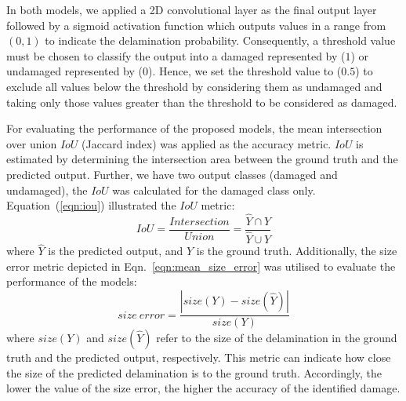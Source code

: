 In both models, we applied a 2D convolutional layer as the final output layer followed by a sigmoid activation function which outputs values in a range from \((0,1)\) to indicate the delamination probability.
Consequently, a threshold value must be chosen to classify the output into a damaged represented by (\(1\)) or undamaged represented by (\(0\)).
Hence, we set the threshold value to (\(0.5\)) to exclude all values below the threshold by considering them as undamaged and taking only those values greater than the threshold to be considered as damaged.

For evaluating the performance of the proposed models, the mean 
intersection over union \(IoU\) (Jaccard index) was applied as the accuracy metric. 
\(IoU\) is estimated by determining the intersection
area between the ground truth and the predicted output. 
Further, we have two output classes (damaged and undamaged), the \(IoU\) was calculated for the damaged class only. 
Equation~(\ref{eqn:iou}) illustrated the \(IoU\) metric: 
\begin{equation}
	IoU=\frac{Intersection}{Union}=\frac{\hat{Y} \cap Y}{\hat{Y} \cup Y}
	\label{eqn:iou}
\end{equation}
where \(\hat{Y}\) is the predicted output, and \(Y\) is the ground truth.
Additionally, the size error metric depicted in Eqn.~\ref{eqn:mean_size_error} was utilised to evaluate the performance of the models:
\begin{equation}
	size \ error=\frac{|size(Y) - size(\hat{Y})|}{size(Y)}
	\label{eqn:mean_size_error}
\end{equation}
where \(size(Y)\) and \(size(\hat{Y})\) refer to the size of the delamination in the ground truth and the predicted output, respectively.
This metric can indicate how close the size of the predicted delamination is to the ground truth.
Accordingly, the lower the value of the size error, the higher the accuracy of the identified damage. 